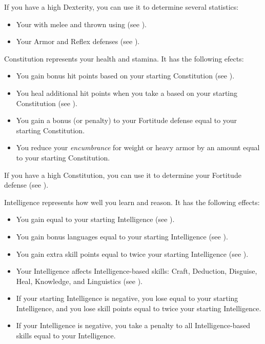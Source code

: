                 If you have a high Dexterity, you can use it to determine several statistics:
                \begin{itemize}
                    \item Your  with melee and thrown  using  (see ).
                    \item Your Armor and Reflex defenses (see ).
                \end{itemize}

            \label{Constitution}
                Constitution represents your health and stamina.
                It has the following efects:
                \begin{itemize}
                    \item You gain bonus hit points based on your starting Constitution (see ).
                    \item You heal additional hit points when you take a  based on your starting Constitution (see ).
                    \item You gain a bonus (or penalty) to your Fortitude defense equal to your starting Constitution.
                    \item You reduce your \textit{encumbrance} for weight or heavy armor by an amount equal to your starting Constitution.
                \end{itemize}

                If you have a high Constitution, you can use it to determine your Fortitude defense (see ).

            \label{Intelligence}
                Intelligence represents how well you learn and reason.
                It has the following effects:

                \begin{itemize}
                    \item You gain  equal to your starting Intelligence (see ).
                    \item You gain bonus languages equal to your starting Intelligence (see ).
                    \item You gain extra skill points equal to twice your starting Intelligence (see ).
                    \item Your Intelligence affects Intelligence-based skills: Craft, Deduction, Disguise, Heal, Knowledge, and Linguistics (see ).
                    \item If your starting Intelligence is negative, you lose  equal to your starting Intelligence, and you lose skill points equal to twice your starting Intelligence.
                    \item If your Intelligence is negative, you take a penalty to all Intelligence-based skills equal to your Intelligence.
                \end{itemize}

